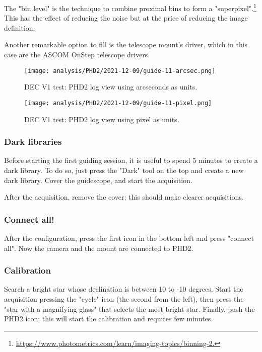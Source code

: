 The "bin level" is the technique to combine proximal bins to form a "superpixel".\footnote{\url{https://www.photometrics.com/learn/imaging-topics/binning-2.}}
This has the effect of reducing the noise but at the price of reducing the image definition.

Another remarkable option to fill is the telescope mount's driver, which in this case are the ASCOM OnStep telescope drivers.

\begin{figure*}[t]
    \centering
    \texttt{[image: analysis/PHD2/2021-12-09/guide-11-arcsec.png]}
    \caption{DEC V1 test: PHD2 log view using arcseconds as units.}
    \label{fig:guide-11-arcsec}
\end{figure*}
\begin{figure*}[t]
    \centering
    \texttt{[image: analysis/PHD2/2021-12-09/guide-11-pixel.png]}
    \caption{DEC V1 test: PHD2 log view using pixel as units.}
    \label{fig:guide-11-pixel}
\end{figure*}

\subsubsection{Dark libraries}
Before starting the first guiding session, it is useful to spend 5 minutes to create a dark library.
To do so, just press the "Dark" tool on the top and create a new dark library.
Cover the guidescope, and start the acquisition.

After the acquisition, remove the cover;
this should make clearer acquisitions.

\subsubsection{Connect all!}
After the configuration, press the first icon in the bottom left and press "connect all".
Now the camera and the mount are connected to PHD2.

\subsubsection{Calibration}
Search a bright star whose declination is between 10 to -10 degrees.
Start the acquisition pressing the "cycle" icon (the second from the left), then press the "star with a magnifying glass" that selects the most bright star.
Finally, push the PHD2 icon; this will start the calibration and requires few minutes.

